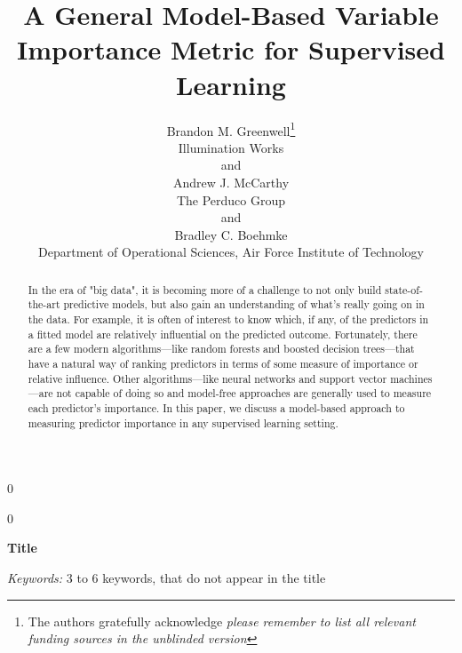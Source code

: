 \documentclass[12pt]{article}
\newcommand{\blind}{0}
\begin{document}
%

\def\spacingset#1{\renewcommand{\baselinestretch}%
{#1}\small\normalsize} \spacingset{1}



\blind
{
  \title{\bf A General Model-Based Variable Importance Metric for Supervised Learning}
  \author{Brandon M. Greenwell\thanks{
    The authors gratefully acknowledge \textit{please remember to list all relevant funding sources in the unblinded version}}\hspace{.2cm}\\
    Illumination Works           \\
    and \\
    Andrew J. McCarthy \\
    The Perduco Group \\
    and \\
    Bradley C. Boehmke \\
    Department of Operational Sciences, Air Force Institute of Technology}
  \maketitle
} \fi

\blind
{
  \bigskip
  \bigskip
  \bigskip
  \begin{center}
    {\LARGE\bf Title}
\end{center}
  \medskip
} \fi

\bigskip
\begin{abstract}
In the era of "big data", it is becoming more of a challenge to not only build state-of-the-art predictive models, but also gain an understanding of what's really going on in the data. For example, it is often of interest to know which, if any, of the predictors in a fitted model are relatively influential on the predicted outcome. Fortunately, there are a few modern algorithms---like random forests and boosted decision trees---that have a natural way of ranking predictors in terms of some measure of importance or relative influence. Other algorithms---like neural networks and support vector machines---are not capable of doing so and model-free approaches are generally used to measure each predictor's importance. In this paper, we discuss a model-based approach to measuring predictor importance in any supervised learning setting.
\end{abstract}

\noindent%
{\it Keywords:}  3 to 6 keywords, that do not appear in the title
\vfill
\end{document}
